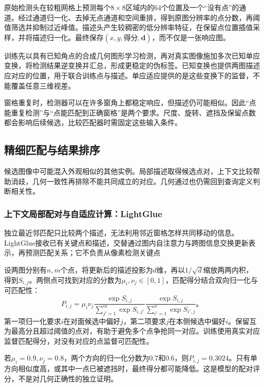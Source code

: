 原始检测头在较粗网格上预测每个$8\times8$区域内的64个位置及一个“没有点”的通道。经过通道归一化、去掉无点通道和空间重排，得到原图分辨率的点分数，再阈值筛选并抑制过近峰值。描述头产生较稠密的低分辨率特征，在保留点位置插值采样，并将描述归一化。最终保存$(x,y,\text{得分},\bm{d})$，而不仅是一张响应图。

训练先以具有已知角点的合成几何图形学习检测，再对真实图像施加多次已知单应变换，将检测结果逆变换并汇总，形成更稳定的伪标签。已知变换也提供两图描述应对应的位置，用于联合训练点与描述。单应适应提供的是这些变换下的监督，不能覆盖任意三维视差。

窗格重复时，检测器可以在许多窗角上都稳定响应，但描述仍可能相似。因此“点能重复检测”与“点能匹配到正确窗格”是两个要求。尺度、旋转、遮挡及保留点数都会影响后续候选，比较匹配器时需固定这些输入条件。

\subsection{精细匹配与结果排序}
\label{sec:vision-recognition-verification}

候选图像中可能混入外观相似的其他实例。局部描述取得候选点对，上下文比较帮助消歧，几何一致性再排除不能共同成立的对应。几何通过也仍需回到查询定义判断相关性。

\Needspace{55mm}
\subsubsection{上下文局部配对与自适应计算：LightGlue}
\label{sec:vision-recognition-lightglue}

独立最近邻匹配只比较两个描述，无法利用邻近窗格怎样共同移动的信息。LightGlue接收已有关键点和描述，交替通过图内自注意力与跨图信息交换更新表示，再预测匹配关系；它不负责从像素检测关键点

设两图分别有$n,m$个点，将更新后的描述投影为$d$维，再以$1/\sqrt d$缩放两两内积，得到$S_{i,j}$。两侧点可找到对应的分数为$\mu_i,\nu_j\in[0,1]$，匹配得分结合双向归一化与可匹配性：
\begin{equation}
 P_{i,j}=\mu_i\nu_j
 \frac{\exp S_{i,j}}{\sum_{j'=1}^{m}\exp S_{i,j'}}
 \frac{\exp S_{i,j}}{\sum_{i'=1}^{n}\exp S_{i',j}}\text{。}
 \label{eq:vision-lightglue-score}
\end{equation}
第一项归一化要求$i$在对面候选中偏好$j$，第二项要求$j$在本侧候选中偏好$i$。保留互为最高分且超过阈值的点对，有助于避免多个点争抢同一对应。训练使用真实对应监督匹配得分，对没有对应的点监督可匹配性。

若$\mu_i=0.9,\nu_j=0.8$，两个方向的归一化分数为0.7和0.6，则$P_{i,j}=0.3024$。只有单方向相似度高，或其中一点已被遮挡时，最终得分都可能降低。这是模型的配对评分，不是对几何正确性的独立证明。


